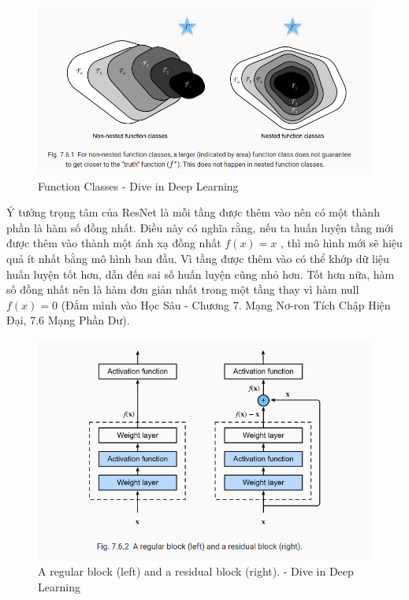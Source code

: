 \documentclass{article}
\begin{document}
	\begin{figure}[H]
		\centering
		\includegraphics[width=1\linewidth]{architecture/function_classes.png}
		\caption{Function Classes - Dive in Deep Learning}
		\label{fig:writing-thesis}
	\end{figure}
	Ý tưởng trọng tâm của ResNet là mỗi tầng được thêm vào nên có một thành phần là hàm số đồng nhất. Điều này có nghĩa rằng, nếu ta huấn luyện tầng mới được thêm vào thành một ánh xạ đồng nhất  $f(x)=x$ , thì mô hình mới sẽ hiệu quả ít nhất bằng mô hình ban đầu. Vì tầng được thêm vào có thể khớp dữ liệu huấn luyện tốt hơn, dẫn đến sai số huấn luyện cũng nhỏ hơn. Tốt hơn nữa, hàm số đồng nhất nên là hàm đơn giản nhất trong một tầng thay vì hàm null  $f(x)=0$ (Đắm mình vào Học Sâu - Chương 7. Mạng Nơ-ron Tích Chập Hiện Đại, 7.6 Mạng Phần Dư).
	\begin{figure}[H]
		\centering
		\includegraphics[width=1\linewidth]{architecture/regular_block_residual_block.png}
		\caption{A regular block (left) and a residual block (right). - Dive in Deep Learning}
		\label{fig:writing-thesis}
	\end{figure}
\end{document}
